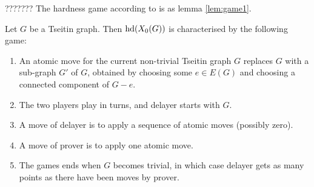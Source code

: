 \documentclass[12pt]{book}
\begin{document}
???????
The hardness game according to \cite{h5} is as lemma \ref{lem:game1}.
\begin{lem}\label{lem:game1}
      Let $G$ be a Tseitin graph. Then $\operatorname{hd}(X_0(G))$ is characterised by the following game:
	  \begin{enumerate}
	  \item An atomic move for the current non-trivial Tseitin graph $G$ replaces $G$ with a sub-graph $G'$ of $G$, obtained by choosing 
	  some $e \in E(G)$ and choosing a connected component of $G - e$.
	  \item The two players play in turns, and delayer starts with $G$.
	  \item A move of delayer is to apply a sequence of atomic moves (possibly zero).
	  \item A move of prover is to apply one atomic move.
	  \item The games ends when $G$ becomes trivial, in which case delayer gets as many points as there have been moves by prover.
	  \end{enumerate}
\end{lem}
\end{document}
